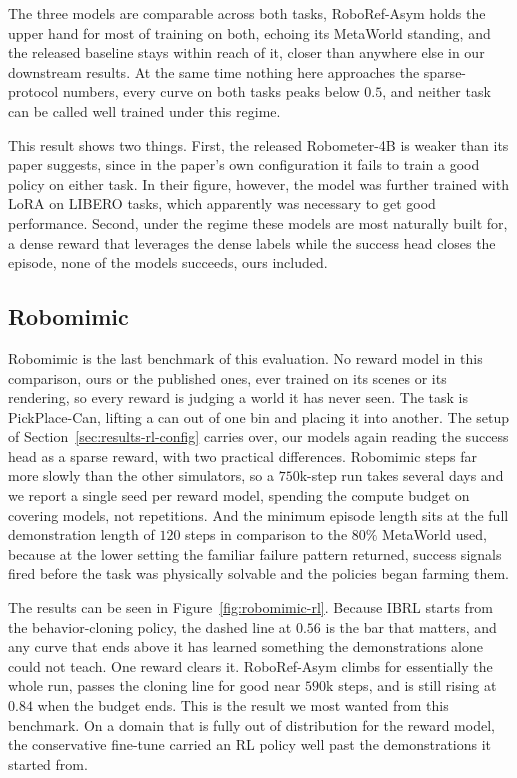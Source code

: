 The three models are comparable across both tasks, RoboRef-Asym holds the upper hand for most of training on both, echoing its MetaWorld standing, and the released baseline stays within reach of it, closer than anywhere else in our downstream results. At the same time nothing here approaches the sparse-protocol numbers, every curve on both tasks peaks below $0.5$, and neither task can be called well trained under this regime. 

This result shows two things. First, the released Robometer-4B is weaker than its paper suggests, since in the paper's own configuration it fails to train a good policy on either task. In their figure, however, the model was further trained with LoRA on LIBERO tasks, which apparently was necessary to get good performance. Second, under the regime these models are most naturally built for, a dense reward that leverages the dense labels while the success head closes the episode, none of the models succeeds, ours included.

\subsection{Robomimic}
\label{sec:results-rl-robomimic}

Robomimic is the last benchmark of this evaluation. No reward model in this comparison, ours or the published ones, ever trained on its scenes or its rendering, so every reward is judging a world it has never seen. The task is PickPlace-Can, lifting a can out of one bin and placing it into another. The setup of Section~\ref{sec:results-rl-config} carries over, our models again reading the success head as a sparse reward, with two practical differences. Robomimic steps far more slowly than the other simulators, so a $750$k-step run takes several days and we report a single seed per reward model, spending the compute budget on covering models, not repetitions. And the minimum episode length sits at the full demonstration length of $120$ steps in comparison to the $80\%$ MetaWorld used, because at the lower setting the familiar failure pattern returned, success signals fired before the task was physically solvable and the policies began farming them.

The results can be seen in Figure~\ref{fig:robomimic-rl}. Because IBRL starts from the behavior-cloning policy, the dashed line at $0.56$ is the bar that matters, and any curve that ends above it has learned something the demonstrations alone could not teach. One reward clears it. RoboRef-Asym climbs for essentially the whole run, passes the cloning line for good near $590$k steps, and is still rising at $0.84$ when the budget ends. This is the result we most wanted from this benchmark. On a domain that is fully out of distribution for the reward model, the conservative fine-tune carried an RL policy well past the demonstrations it started from.


